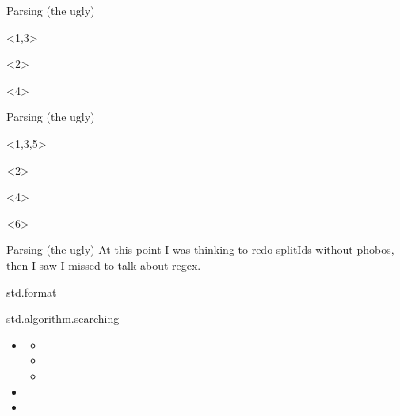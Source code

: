 \documentclass[aspectratio=169,notes]{beamer}
\begin{document}
	\begin{frame}[fragile]{Parsing (the ugly)}
		\begin{onlyenv}
			
		\end{onlyenv}
		\begin{onlyenv}<2>
			
		\end{onlyenv}
		\begin{onlyenv}<4>
			
		\end{onlyenv}
	\end{frame}
	\begin{frame}[fragile]{Parsing (the ugly)}
		\begin{onlyenv}<1,3,5>
			
		\end{onlyenv}
		\begin{onlyenv}<2>
			
		\end{onlyenv}
		\begin{onlyenv}<4>
			
		\end{onlyenv}
		\begin{onlyenv}<6>
			
		\end{onlyenv}
	\end{frame}
	\begin{frame}[fragile]{Parsing (the ugly)}
At this point I was thinking to redo splitIds without phobos, then I saw I missed to
talk about regex.
	\end{frame}

	\begin{frame}[fragile]{std.format}
		
	\end{frame}

	\begin{frame}[fragile]{std.algorithm.searching}
		\begin{itemize}
			\item \lstinline@find@
			\begin{itemize}
				\item \lstinline@canFind@
				\item \lstinline@until@
				\item \lstinline@countUntil@
			\end{itemize}
			\item \lstinline@startsWith@
			\item \lstinline@endsWith@
		\end{itemize}
	\end{frame}
\end{document}
